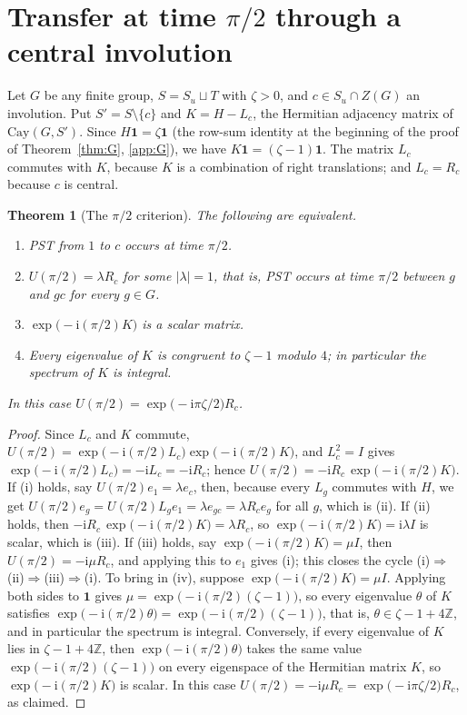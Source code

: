 \documentclass[preprint,11pt]{elsarticle}
\newtheorem{theorem}{Theorem}[section]
\theoremstyle{definition}
\theoremstyle{remark}
\newcommand{\Z}{\mathbb Z}
\newcommand{\ii}{\mathrm i}
\begin{document}
\section{Transfer at time $\pi/2$ through a central involution}\label{sec:nn}

Let $G$ be any finite group, $S=S_u\sqcup T$ with $\zeta>0$, and $c\in S_u\cap Z(G)$ an involution. Put $S'=S\setminus\{c\}$ and $K=H-L_c$, the Hermitian adjacency matrix of $\mathrm{Cay}(G,S')$. Since $H\mathbf 1=\zeta\mathbf 1$ (the row-sum identity at the beginning of the proof of Theorem~\ref{thm:G}, \ref{app:G}), we have $K\mathbf 1=(\zeta-1)\mathbf 1$. The matrix $L_c$ commutes with $K$, because $K$ is a combination of right translations; and $L_c=R_c$ because $c$ is central.

\begin{theorem}[The $\pi/2$ criterion]\label{thm:pi2}
The following are equivalent.
\begin{enumerate}
\item[(i)] PST from $1$ to $c$ occurs at time $\pi/2$.
\item[(ii)] $U(\pi/2)=\lambda R_c$ for some $|\lambda|=1$, that is, PST occurs at time $\pi/2$ between $g$ and $gc$ for every $g\in G$.
\item[(iii)] $\exp\bigl(-\ii(\pi/2)K\bigr)$ is a scalar matrix.
\item[(iv)] Every eigenvalue of $K$ is congruent to $\zeta-1$ modulo $4$; in particular the spectrum of $K$ is integral.
\end{enumerate}
In this case $U(\pi/2)=\exp\bigl(-\ii\pi\zeta/2\bigr)R_c$.
\end{theorem}
\begin{proof}
Since $L_c$ and $K$ commute, $U(\pi/2)=\exp\bigl(-\ii(\pi/2)L_c\bigr)\allowbreak\exp\bigl(-\ii(\pi/2)K\bigr)$, and $L_c^2=I$ gives $\exp\bigl(-\ii(\pi/2)L_c\bigr)=-\ii L_c=-\ii R_c$; hence $U(\pi/2)=-\ii R_c\,\exp\bigl(-\ii(\pi/2)K\bigr)$. If (i) holds, say $U(\pi/2)e_1=\lambda e_c$, then, because every $L_g$ commutes with $H$, we get $U(\pi/2)e_g=U(\pi/2)L_ge_1=\lambda e_{gc}=\lambda R_ce_g$ for all $g$, which is (ii). If (ii) holds, then $-\ii R_c\,\exp\bigl(-\ii(\pi/2)K\bigr)=\lambda R_c$, so $\exp\bigl(-\ii(\pi/2)K\bigr)=\ii\lambda I$ is scalar, which is (iii). If (iii) holds, say $\exp\bigl(-\ii(\pi/2)K\bigr)=\mu I$, then $U(\pi/2)=-\ii\mu R_c$, and applying this to $e_1$ gives (i); this closes the cycle (i)$\Rightarrow$(ii)$\Rightarrow$(iii)$\Rightarrow$(i). To bring in (iv), suppose $\exp\bigl(-\ii(\pi/2)K\bigr)=\mu I$. Applying both sides to $\mathbf 1$ gives $\mu=\exp\bigl(-\ii(\pi/2)(\zeta-1)\bigr)$, so every eigenvalue $\theta$ of $K$ satisfies $\exp\bigl(-\ii(\pi/2)\theta\bigr)=\exp\bigl(-\ii(\pi/2)(\zeta-1)\bigr)$, that is, $\theta\in\zeta-1+4\Z$, and in particular the spectrum is integral. Conversely, if every eigenvalue of $K$ lies in $\zeta-1+4\Z$, then $\exp\bigl(-\ii(\pi/2)\theta\bigr)$ takes the same value $\exp\bigl(-\ii(\pi/2)(\zeta-1)\bigr)$ on every eigenspace of the Hermitian matrix $K$, so $\exp\bigl(-\ii(\pi/2)K\bigr)$ is scalar. In this case $U(\pi/2)=-\ii\mu R_c=\exp\bigl(-\ii\pi\zeta/2\bigr)R_c$, as claimed.
\end{proof}
\end{document}
